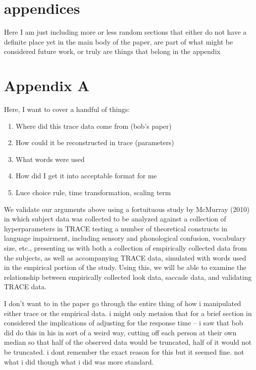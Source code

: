 \documentclass{article}
\begin{document}
\section{appendices}

Here  I am just including more or less random sections that either do not have a definite place yet in the main body of the paper, are part of what might be considered future work, or truly are things that belong in the appendix

\section*{Appendix A}



Here, I want to cover a handful of things:

\begin{enumerate}
\item Where did this trace data come from (bob's paper)
\item How could it be reconstructed in trace (parameters)
\item What words were used
\item How did I get it into acceptable format for me
\item Luce choice rule, time transformation, scaling term
\end{enumerate}

We validate our arguments above using a fortuituous study by McMurray (2010) in which subject data was collected to be analyzed against a collection of hyperparameters in TRACE testing a number of theoretical constructs in language impairment, including sensory and phonological confusion, vocabulary size, etc., presenting us with both a collection of empirically collected data from the subjects, as well as accompanying TRACE data, simulated with words used in the empirical portion of the study. Using this, we will be able to examine the relationship between empirically collected look data, saccade data, and validating TRACE data.

I don't want to in the paper go through the entire thing of how i manipulated either trace or the empirical data. i might only metnion that for a brief section in considered the implications of adjusting for the response time -- i saw that bob did do this in his in sort of a weird way, cutting off each person at their own median so that half of the observed data would be truncated, half of it would not be truncated. i dont remember the  exact reason for this but it seemed fine. not what i did though what i did was more standard.
\end{document}

